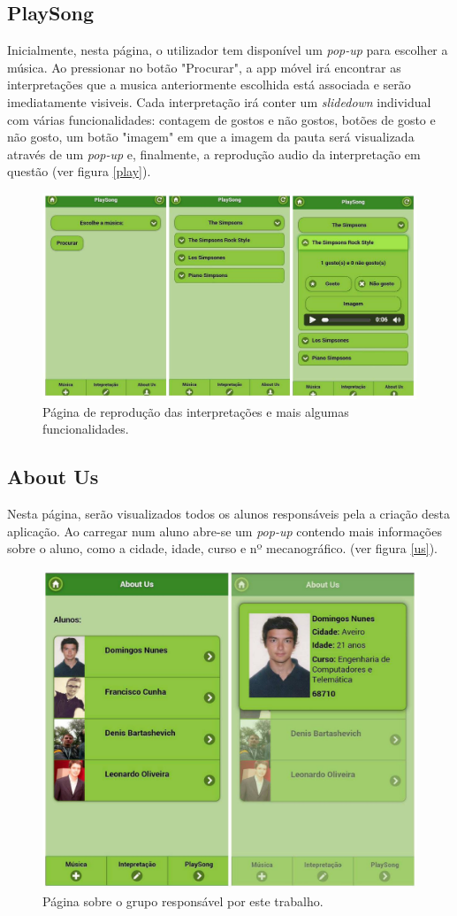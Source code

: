 \subsection{PlaySong}

Inicialmente, nesta página, o utilizador tem disponível um \emph{pop-up} para escolher a música. Ao pressionar no botão "Procurar", a app móvel irá encontrar as interpretações que a musica anteriormente escolhida está associada e serão imediatamente visiveis. Cada interpretação irá conter um \emph{slidedown} individual com várias funcionalidades: contagem de gostos e não gostos, botões de gosto e não gosto, um botão "imagem" em que a imagem da pauta será visualizada através de um \emph{pop-up} e, finalmente, a reprodução audio da interpretação em questão (ver figura \autoref{play}).

\begin{figure}[htp]
\centering
\includegraphics[width=\textwidth]{images/appPlaySong.jpg}
\caption{Página de reprodução das interpretações e mais algumas funcionalidades.}
\label{play}
\end{figure}

\subsection{About Us}

Nesta página, serão visualizados todos os alunos responsáveis pela a criação desta aplicação. Ao carregar num aluno abre-se um \emph{pop-up} contendo mais informações sobre o aluno, como a cidade, idade, curso e nº mecanográfico. (ver figura \autoref{us}).

\begin{figure}[htp]
\centering
\includegraphics[width=\textwidth]{images/appUs.jpg}
\caption{Página sobre o grupo responsável por este trabalho.}
\label{us}
\end{figure}